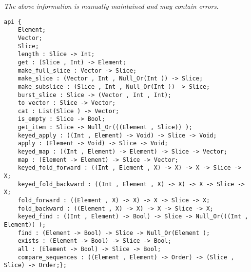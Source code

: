 \label{api:Typelocked\_Vector\_Slice}

{\tiny \it The above information is manually maintained and may contain errors.}
\begin{verbatim}
api {
    Element;
    Vector;
    Slice;
    length : Slice -> Int;
    get : (Slice , Int) -> Element;
    make_full_slice : Vector -> Slice;
    make_slice : (Vector , Int , Null_Or(Int )) -> Slice;
    make_subslice : (Slice , Int , Null_Or(Int )) -> Slice;
    burst_slice : Slice -> (Vector , Int , Int);
    to_vector : Slice -> Vector;
    cat : List(Slice ) -> Vector;
    is_empty : Slice -> Bool;
    get_item : Slice -> Null_Or(((Element , Slice)) );
    keyed_apply : ((Int , Element) -> Void) -> Slice -> Void;
    apply : (Element -> Void) -> Slice -> Void;
    keyed_map : ((Int , Element) -> Element) -> Slice -> Vector;
    map : (Element -> Element) -> Slice -> Vector;
    keyed_fold_forward : ((Int , Element , X) -> X) -> X -> Slice -> X;
    keyed_fold_backward : ((Int , Element , X) -> X) -> X -> Slice -> X;
    fold_forward : ((Element , X) -> X) -> X -> Slice -> X;
    fold_backward : ((Element , X) -> X) -> X -> Slice -> X;
    keyed_find : ((Int , Element) -> Bool) -> Slice -> Null_Or(((Int , Element)) );
    find : (Element -> Bool) -> Slice -> Null_Or(Element );
    exists : (Element -> Bool) -> Slice -> Bool;
    all : (Element -> Bool) -> Slice -> Bool;
    compare_sequences : ((Element , Element) -> Order) -> (Slice , Slice) -> Order;};
\end{verbatim}
